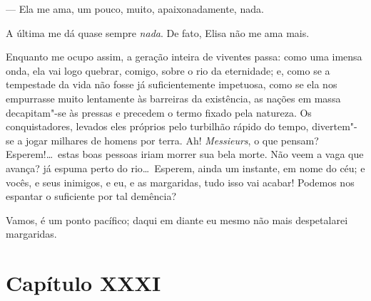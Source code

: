 --- Ela me ama, um pouco, muito, apaixonadamente, nada. 

A última me dá quase sempre \textit{nada}. De fato, Elisa não me ama
mais.

Enquanto me ocupo assim, a geração inteira de viventes passa: como uma
imensa onda, ela vai logo quebrar, comigo, sobre o rio da eternidade;
e, como se a tempestade da vida não fosse já suficientemente impetuosa,
como se ela nos empurrasse muito lentamente às barreiras da existência,
as nações em massa decapitam"-se às pressas e precedem o termo fixado
pela natureza. Os conquistadores, levados eles próprios pelo turbilhão
rápido do tempo, divertem"-se a jogar milhares de homens por terra. Ah!
\textit{Messieurs}, o que pensam? Esperem!\ldots\ estas boas pessoas iriam
morrer sua bela morte. Não veem a vaga que avança? já espuma perto do
rio\ldots\ Esperem, ainda um instante, em nome do céu; e vocês, e seus
inimigos, e eu, e as margaridas, tudo isso vai acabar! Podemos nos
espantar o suficiente por tal demência?

Vamos, é um ponto pacífico; daqui em diante eu mesmo não mais
despetalarei margaridas.

\section*{Capítulo XXXI}


